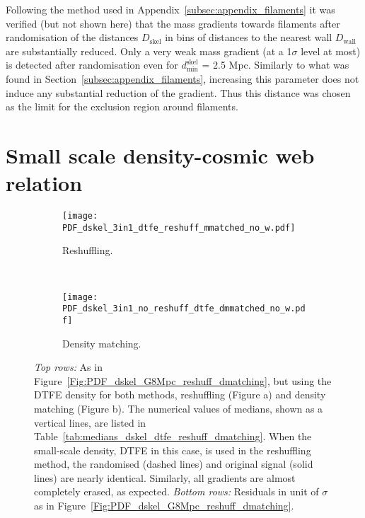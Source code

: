 \documentclass[useAMS,usenatbib]{mnras}
\begin{document}
Following the method used in Appendix~\ref{subsec:appendix_filaments} it was verified (but not shown here) that the mass gradients towards filaments after randomisation of the distances $D_{\mathrm{skel}}$ in bins of distances to the nearest wall $D_{\mathrm{wall}}$ are substantially reduced. Only a very weak mass gradient (at  a 1$\sigma$ level at most) is detected after randomisation even for $d^{\mathrm{skel}}_{\mathrm{min}}$ = 2.5 Mpc. Similarly to what was found in Section~\ref{subsec:appendix_filaments},  increasing  this parameter does not  induce any substantial  reduction of the gradient.  Thus  this distance was chosen as the limit for the exclusion region around filaments.  








\section{Small scale density-cosmic web relation}
\label{sec:appendix_dtfe}

\begin{figure*}
    \centering
    \begin{subfigure}{\textwidth}
        \centering
        \texttt{[image: PDF\_dskel\_3in1\_dtfe\_reshuff\_mmatched\_no\_w.pdf]}
        \caption{Reshuffling.}
    \end{subfigure}%
    \\
    \begin{subfigure}{\textwidth}
        \centering
        \texttt{[image: PDF\_dskel\_3in1\_no\_reshuff\_dtfe\_dmmatched\_no\_w.pdf]}
        \caption{Density matching.}
    \end{subfigure}
    \caption{\textit{Top rows:} As in Figure~\ref{Fig:PDF_dskel_G8Mpc_reshuff_dmatching}, but using the DTFE density for both methods, reshuffling (Figure a) and density matching (Figure b).
The numerical values of medians, shown as a vertical lines, are listed in Table~\ref{tab:medians_dskel_dtfe_reshuff_dmatching}. 
When the small-scale density, DTFE in this case, is used in the reshuffling method, the randomised (dashed lines) and original signal (solid lines) are nearly identical. Similarly, all gradients are almost completely erased, as expected.
 \textit{Bottom rows:} Residuals in unit of $\sigma$ as in Figure~\ref{Fig:PDF_dskel_G8Mpc_reshuff_dmatching}.
 }
    \label{Fig:PDF_dskel_dtfe_reshuff_dmatching}
\end{figure*}
\end{document}
